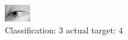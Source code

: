 \begin{figure}[h!]
\begin{center}
\includegraphics[width=0.60\columnwidth]{figures/ID3017_class_3_target_4.png}
\end{center}
\caption{ Classification: 3 actual target: 4}
\label{fig:ID3017_class_3_target_4}
\end{figure}
